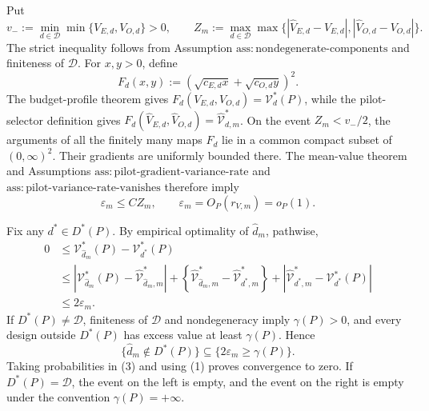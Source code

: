 Put
\[
 v_-:=\min_{d\in\mathcal D}\min\{V_{E,d},V_{O,d}\}>0,
 \qquad
 Z_m:=\max_{d\in\mathcal D}\max\bigl\{
 |\widehat V_{E,d}-V_{E,d}|,
 |\widehat V_{O,d}-V_{O,d}|\bigr\}.
\]
The strict inequality follows from Assumption \(\mathrm{ass{:}nondegenerate\text{-}components}\) and finiteness of \(\mathcal D\).  For \(x,y>0\), define
\[
 F_d(x,y):=\left(\sqrt{c_{E,d}x}+\sqrt{c_{O,d}y}\right)^2.
\]
The budget-profile theorem gives
\(F_d(V_{E,d},V_{O,d})=\mathcal V_d^*(P)\), while the pilot-selector definition gives
\(F_d(\widehat V_{E,d},\widehat V_{O,d})=\widehat{\mathcal V}_{d,m}^*\).  On the event \(Z_m<v_-/2\), the arguments of all the finitely many maps \(F_d\) lie in a common compact subset of \((0,\infty)^2\).  Their gradients are uniformly bounded there.  The mean-value theorem and Assumptions \(\mathrm{ass{:}pilot\text{-}gradient\text{-}variance\text{-}rate}\) and \(\mathrm{ass{:}pilot\text{-}variance\text{-}rate\text{-}vanishes}\) therefore imply
\[
 \varepsilon_m\le C Z_m,
 \qquad
 \varepsilon_m=O_P(r_{V,m})=o_P(1).                                      \tag{1}
\]

Fix any \(d^*\in D^*(P)\).  By empirical optimality of \(\widehat d_m\), pathwise,
\[
\begin{aligned}
0
&\le \mathcal V_{\widehat d_m}^*(P)-\mathcal V_{d^*}^*(P)\\
&\le
 \left|\mathcal V_{\widehat d_m}^*(P)
       -\widehat{\mathcal V}_{\widehat d_m,m}^*\right|
 +\left\{\widehat{\mathcal V}_{\widehat d_m,m}^*
       -\widehat{\mathcal V}_{d^*,m}^*\right\}
 +\left|\widehat{\mathcal V}_{d^*,m}^*
       -\mathcal V_{d^*}^*(P)\right|\\
&\le 2\varepsilon_m .
\end{aligned}                                                              \tag{2}
\]
If \(D^*(P)\ne\mathcal D\), finiteness of \(\mathcal D\) and nondegeneracy imply \(\gamma(P)>0\), and every design outside \(D^*(P)\) has excess value at least \(\gamma(P)\).  Hence
\[
 \{\widehat d_m\notin D^*(P)\}
 \subseteq \{2\varepsilon_m\ge\gamma(P)\}.                              \tag{3}
\]
Taking probabilities in (3) and using (1) proves convergence to zero.  If \(D^*(P)=\mathcal D\), the event on the left is empty, and the event on the right is empty under the convention \(\gamma(P)=+\infty\).

